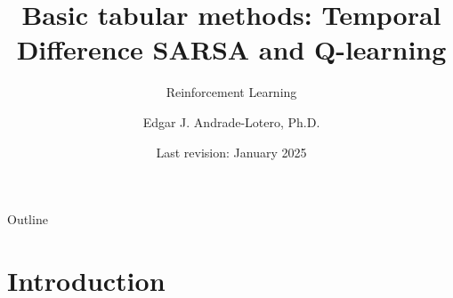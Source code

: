 \documentclass[11pt]{beamer}
\author{Edgar J. Andrade-Lotero, Ph.D.}
\title{Basic tabular methods: Temporal Difference SARSA and Q-learning}
\subtitle{Reinforcement Learning}
\date{Last revision: January 2025}
\begin{document}
\begin{frame}
\titlepage
\end{frame}

\begin{frame}{Outline}
\tableofcontents
\end{frame}



\section{Introduction}
\end{document}
